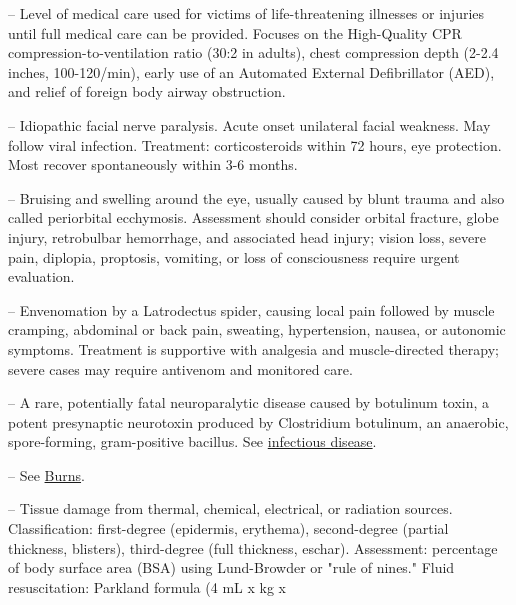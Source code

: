 -- Level of medical care used for victims of life-threatening illnesses or injuries until full medical care can be provided. Focuses on the High-Quality CPR compression-to-ventilation ratio (30:2 in adults), chest compression depth (2-2.4 inches, 100-120/min), early use of an Automated External Defibrillator (AED), and relief of foreign body airway obstruction.

-- Idiopathic facial nerve paralysis. Acute onset unilateral facial weakness. May follow viral infection. Treatment: corticosteroids within 72 hours, eye protection. Most recover spontaneously within 3-6 months.

-- Bruising and swelling around the eye, usually caused by blunt trauma and also called periorbital ecchymosis. Assessment should consider orbital fracture, globe injury, retrobulbar hemorrhage, and associated head injury; vision loss, severe pain, diplopia, proptosis, vomiting, or loss of consciousness require urgent evaluation.

-- Envenomation by a Latrodectus spider, causing local pain followed by muscle cramping, abdominal or back pain, sweating, hypertension, nausea, or autonomic symptoms. Treatment is supportive with analgesia and muscle-directed therapy; severe cases may require antivenom and monitored care.

-- A rare, potentially fatal neuroparalytic disease caused by botulinum toxin, a potent presynaptic neurotoxin produced by Clostridium botulinum, an anaerobic, spore-forming, gram-positive bacillus. See \hyperlink{Infectious Disease}{infectious disease}.

-- See \hyperlink{Burns}{Burns}.

-- Tissue damage from thermal, chemical, electrical, or radiation sources. Classification: first-degree (epidermis, erythema), second-degree (partial thickness, blisters), third-degree (full thickness, eschar). Assessment: percentage of body surface area (BSA) using Lund-Browder or "rule of nines." Fluid resuscitation: Parkland formula (4 mL x kg x %

